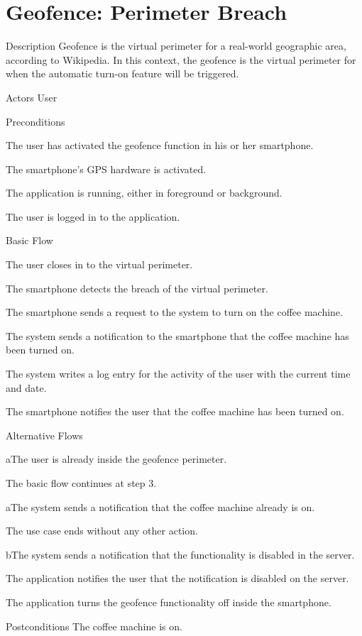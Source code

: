 \section{Geofence: Perimeter Breach}

\begin{cpart}{Description}
Geofence is the virtual perimeter for a real-world geographic area, according to Wikipedia. In this context, the geofence is the virtual perimeter for when the automatic turn-on feature will be triggered.
\end{cpart}

\begin{cpart}{Actors}
User
\end{cpart}

\begin{cpartList}{Preconditions}
\item The user has activated the geofence function in his or her smartphone.
\item The smartphone's GPS hardware is activated.
\item The application is running, either in foreground or background.
\item The user is logged in to the application.
\end{cpartList}

\begin{cpartList}{Basic Flow}
\item The user closes in to the virtual perimeter.
\item The smartphone detects the breach of the virtual perimeter.
\item The smartphone sends a request to the system to turn on the coffee machine.
\item The system sends a notification to the smartphone that the coffee machine has been turned on.
\item The system writes a log entry for the activity of the user with the current time and date.
\item The smartphone notifies the user that the coffee machine has been turned on.
\end{cpartList}

\begin{cpartList}{Alternative Flows}
\begin{innerList}{1}{a}{The user is already inside the geofence perimeter.}
\item The basic flow continues at step 3.
\end{innerList}
\begin{innerList}{4}{a}{The system sends a notification that the coffee machine already is on.}
\item The use case ends without any other action.
\end{innerList}
\begin{innerList}{4}{b}{The system sends a notification that the functionality is disabled in the server.}
\item The application notifies the user that the notification is disabled on the server.
\item The application turns the geofence functionality off inside the smartphone.
\end{innerList}
\end{cpartList}

\begin{cpart}{Postconditions}
The coffee machine is on.
\end{cpart}

\clearpage
